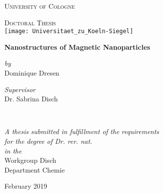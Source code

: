\begin{titlepage}
\begin{center}
{\scshape\LARGE University of Cologne\par}
\vspace{1cm} %
\textsc{\Large Doctoral Thesis}\\[0.5cm] %
\vspace{.5cm}
\texttt{[image: Universitaet\_zu\_Koeln-Siegel]}

{\huge \bfseries Nanostructures of Magnetic Nanoparticles\par}
\vspace{0.4cm} %
 
\begin{minipage}[t]{0.4\textwidth}
\begin{flushleft} \large
\centering
\textit{by}\\
Dominique Dresen
\end{flushleft}
\end{minipage}
\begin{minipage}[t]{0.4\textwidth}
\begin{flushright} \large
\centering
\textit{Supervisor}\\
Dr. Sabrina Disch %
\end{flushright}
\end{minipage}\\[3cm]

\vfill

\large \textit{A thesis submitted in fulfillment of the requirements\\ for the degree of Dr. rer. nat.}\\[0.3cm]
\textit{in the}\\[0.4cm]
Workgroup Disch\\Department Chemie\\[2cm]
 
\vfill

{\large February 2019} 
\end{center}

\end{titlepage}
